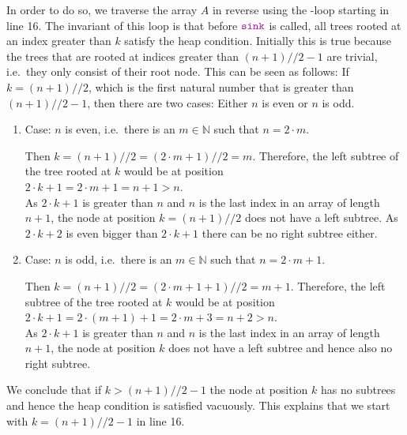 \begin{enumerate}
\begin{enumerate}
            In order to do so, we traverse the array ${A}$ in reverse using the
            -loop starting in line 16.  The invariant of this loop is that before
            $\mytt{sink}$ is called, all trees rooted at an index greater than 
            ${k}$ satisfy the heap condition.  Initially this is true because the trees that
            are rooted at indices greater than  $(n + 1) // 2 - 1$ are trivial, i.e.~they only
            consist of their root node.  This can be seen as follows:  If $k = (n + 1)//2$, which is the first
            natural number that is greater than $(n + 1) // 2 - 1$, then there are two cases:
            Either $n$ is even or $n$ is odd.
            \begin{enumerate}
            \item Case: $n$ is even, i.e.~there is an $m\in \mathbb{N}$ such that $n = 2 \cdot m$.

                  Then $k = (n + 1)//2 = (2 \cdot m + 1) // 2 = m$.  Therefore, the left subtree of the tree 
                  rooted at $k$ would be at position 
                  \\[0.2cm]
                  \hspace*{1.3cm}
                  $2 \cdot k + 1 = 2 \cdot m + 1 = n + 1 > n$.
                  \\[0.2cm]
                  As $2 \cdot k  + 1$ is greater than $n$ and $n$ is the last index in an array of length $n+1$, the
                  node at position $k = (n+1)//2$ does not have a left subtree.  As $2 \cdot k + 2$ is even 
                  bigger than $2 \cdot k + 1$ there can be no right subtree either.
            \item Case: $n$ is odd, i.e.~there is an $m \in \mathbb{N}$ such that $n = 2 \cdot m + 1$.

                  Then $k = (n + 1)//2 = (2 \cdot m + 1 + 1) // 2 = m + 1$.  Therefore, the left subtree
                  of the tree rooted at $k$ would be at position
                  \\[0.2cm]
                  \hspace*{1.3cm}
                  $2 \cdot k + 1 = 2 \cdot (m + 1) + 1 = 2 \cdot m + 3 = n + 2 > n$.
                  \\[0.2cm]
                  As $2 \cdot k + 1$ is greater than $n$ and $n$ is the last index in an array of length $n+1$, 
                  the node at position $k$ does not have a left subtree and hence also no right subtree. 
            \end{enumerate}
            We conclude that if $k > (n + 1)//2 - 1$ the node at position $k$ has no subtrees and hence the heap
            condition is satisfied vacuously.   This explains that we start with $k = (n+1)//2 - 1$ in line 16.
            

\end{enumerate}
\end{enumerate}

